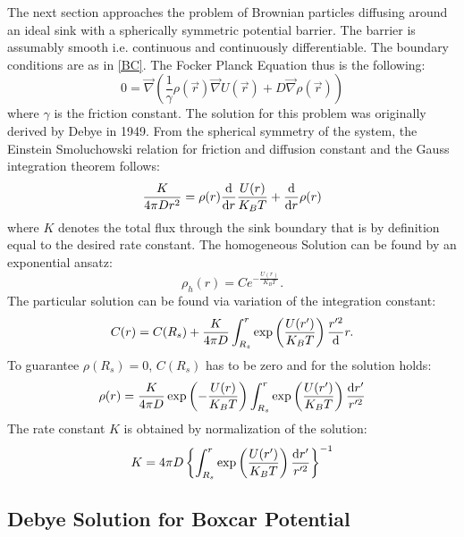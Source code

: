 The next section approaches the problem of Brownian particles diffusing around an ideal sink with a spherically symmetric potential barrier. The barrier is assumably smooth i.e. continuous and continuously differentiable. The boundary conditions are as in \eqref{BC}. The Focker Planck Equation thus is the following:
\begin{equation}
    0=\vec{\nabla}\left( \frac{1}{\gamma} \rho(\vec{r}) \vec{\nabla} U(\vec{r}) + D \vec{\nabla} \rho(\vec{r}) \right)
\end{equation}
where $\gamma$ is the friction constant. The solution for this problem was originally derived by Debye in 1949.
From the spherical symmetry of the system, the Einstein Smoluchowski relation for friction and diffusion constant and the Gauss integration theorem follows:
\begin{equation}
    \frac{K}{4 \pi D r^{2}} = \rho(r)\frac{{\rm d}}{{\rm d}r} \frac{U(r)}{K_B T} + \frac{{\rm d}}{{\rm d}r}\rho(r) 
\end{equation}
where $K$ denotes the total flux through the sink boundary that is by definition equal to the desired rate constant.
The homogeneous Solution can be found by an exponential ansatz:
\begin{equation}
    \rho_h(r) = C e^{-\frac{U(r)}{K_B T}}.
\end{equation}
The particular solution can be found via variation of the integration constant:
\begin{equation}
    C(r) = C(R_s) + \frac{K}{4 \pi D} \int_{R_s}^{r} \exp \left( \frac{U(r')}{K_B T} \right)\frac{r'^{2}} {{\rm d}}r.
\end{equation}
To guarantee $\rho(R_s) = 0$, $C(R_s)$ has to be zero and for the solution holds:
\begin{equation}
    \rho(r) = \frac{K}{4 \pi D}\exp\left( -\frac{U(r)}{K_B T} \right) \int_{R_s}^{r} \exp\left( \frac{U(r')}{K_B T} \right)\frac{  {\rm d} r' }{r'^{2}}
    \label{Debye Solution}
\end{equation}
The rate constant $K$ is obtained by normalization of the solution:
\begin{equation}
    K = 4 \pi D \left\{  \int_{R_s}^{r} \exp\left( \frac{U(r')}{K_B T} \right)\frac{  {\rm d} r' }{r'^{2}} \right\}^{-1}
\end{equation}

\subsection{Debye Solution for Boxcar Potential}

